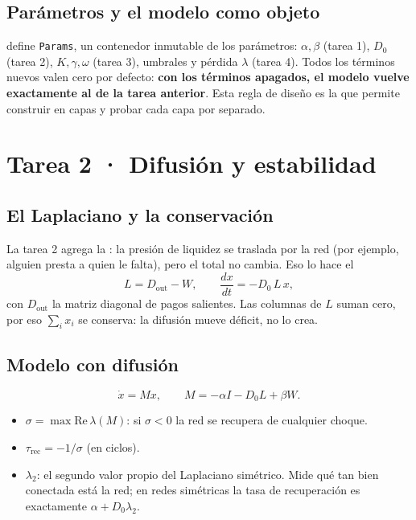 \section{Parámetros y el modelo como objeto}
 define \texttt{Params}, un contenedor inmutable de los
parámetros: $\alpha,\beta$ (tarea 1), $D_0$ (tarea 2), $K,\gamma,\omega$ (tarea 3),
umbrales y pérdida $\lambda$ (tarea 4). Todos los términos nuevos valen cero por
defecto: \textbf{con los términos apagados, el modelo vuelve exactamente al de la
tarea anterior}. Esta regla de diseño es la que permite construir en capas y probar
cada capa por separado.

\chapter{Tarea 2 · Difusión y estabilidad}

\section{El Laplaciano y la conservación}
La tarea 2 agrega la : la presión de liquidez se traslada por la
red (por ejemplo, alguien presta a quien le falta), pero el total no cambia. Eso lo
hace el 
\[
L = D_\text{out} - W,\qquad \frac{dx}{dt} = -D_0\,L\,x,
\]
con $D_\text{out}$ la matriz diagonal de pagos salientes. Las columnas de $L$ suman
cero, por eso $\sum_i x_i$ se conserva: la difusión mueve déficit, no lo crea.

\section{Modelo con difusión}
\[
\dot x = M x,\qquad M = -\alpha I - D_0 L + \beta W.
\]
\begin{itemize}
\item {} $\sigma = \max\mathrm{Re}\,\lambda(M)$: si $\sigma<0$ la red
se recupera de cualquier choque.
\item {} $\tau_\text{rec} = -1/\sigma$ (en ciclos).
\item {} $\lambda_2$: el segundo valor propio del
Laplaciano simétrico. Mide qué tan bien conectada está la red; en redes simétricas
la tasa de recuperación es exactamente $\alpha + D_0\lambda_2$.
\end{itemize}

